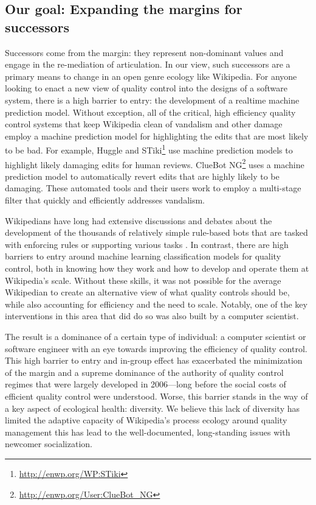 \subsection{Our goal: Expanding the margins for successors}
Successors come from the margin: they represent non-dominant values and engage in the re-mediation of articulation\cite{mugar2017preserving}.  In our view, such successors are a primary means to change in an open genre ecology like Wikipedia.  For anyone looking to enact a new view of quality control into the designs of a software system, there is a high barrier to entry: the development of a realtime machine prediction model.  Without exception, all of the critical, high efficiency quality control systems that keep Wikipedia clean of vandalism and other damage employ a machine prediction model for highlighting the edits that are most likely to be bad. For example, Huggle and STiki\footnote{\url{http://enwp.org/WP:STiki}} use machine prediction models to highlight likely damaging edits for human reviews.  ClueBot NG\footnote{\url{http://enwp.org/User:ClueBot_NG}} uses a machine prediction model to automatically revert edits that are highly likely to be damaging.  These automated tools and their users work to employ a multi-stage filter that quickly and efficiently addresses vandalism\cite{geiger2013levee}.

Wikipedians have long had extensive discussions and debates about the development of the thousands of relatively simple rule-based bots that are tasked with enforcing rules or supporting various tasks \cite{geiger2011lives}. In contrast, there are high barriers to entry around machine learning classification models for quality control, both in knowing how they work and how to develop and operate them at Wikipedia's scale.  Without these skills, it was not possible for the average Wikipedian to create an alternative view of what quality controls should be, while also accounting for efficiency and the need to scale.  Notably, one of the key interventions in this area that did do so was also built by a computer scientist\cite{halfaker2014snuggle}.

The result is a dominance of a certain type of individual: a computer scientist or software engineer with an eye towards improving the efficiency of quality control.  This high barrier to entry and in-group effect has exacerbated the minimization of the margin and a supreme dominance of the authority of quality control regimes that were largely developed in 2006---long before the social costs of efficient quality control were understood.  Worse, this barrier stands in the way of a key aspect of ecological health: diversity.  We believe this lack of diversity has limited the adaptive capacity of Wikipedia's process ecology around quality management this has lead to the well-documented, long-standing issues with newcomer socialization\cite{halfaker2013rise}.

